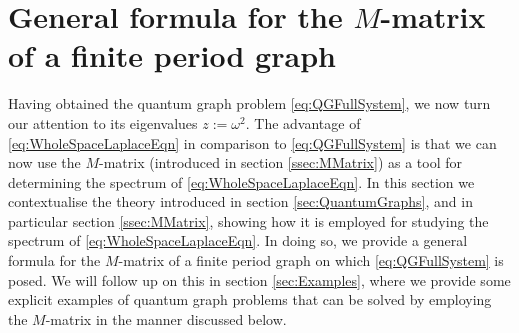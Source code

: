 \section{General formula for the $M$-matrix of a finite period graph} \label{sec:Discussion}
Having obtained the quantum graph problem \eqref{eq:QGFullSystem}, we now turn our attention to its eigenvalues $z := \omega^2$.
The advantage of \eqref{eq:WholeSpaceLaplaceEqn} in comparison to \eqref{eq:QGFullSystem} is that we can now use the $M$-matrix (introduced in section \ref{ssec:MMatrix}) as a tool for determining the spectrum of \eqref{eq:WholeSpaceLaplaceEqn}.
In this section we contextualise the theory introduced in section \ref{sec:QuantumGraphs}, and in particular section \ref{ssec:MMatrix}, showing how it is employed for studying the spectrum of \eqref{eq:WholeSpaceLaplaceEqn}.
In doing so, we provide a general formula for the $M$-matrix of a finite period graph on which \eqref{eq:QGFullSystem} is posed.
We will follow up on this in section \ref{sec:Examples}, where we provide some explicit examples of quantum graph problems that can be solved by employing the $M$-matrix in the manner discussed below.

